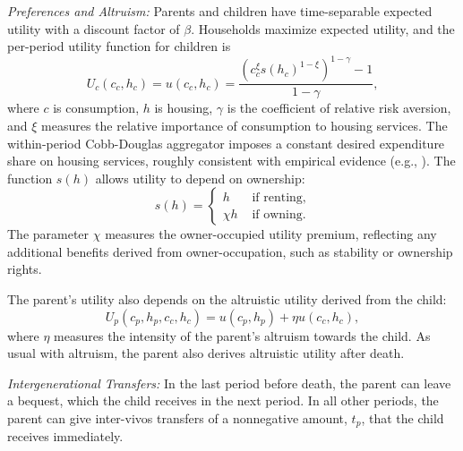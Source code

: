\documentclass[12pt]{article}
\begin{document}
\textit{Preferences and Altruism:} Parents and children have time-separable expected utility with a discount factor of $\beta$. Households maximize expected utility, and the per-period utility function for children is
\begin{equation}
U_c(c_c,h_c) = u(c_c,h_c) = \frac{\left(c_c^\xi s(h_c)^{1-\xi}\right)^{1-\gamma}-1}{1-\gamma},
\end{equation}
where $c$ is consumption, $h$ is housing, $\gamma$ is the coefficient of relative risk aversion, and $\xi$ measures the relative importance of consumption to housing services. The within-period Cobb-Douglas aggregator imposes a constant desired expenditure share on housing services, roughly consistent with empirical evidence (e.g., \cite{davis2011household}). The function $s(h)$ allows utility to depend on ownership:
\begin{equation}
s(h) = \begin{cases}
h & \text{ if renting}, \\
\chi h & \text{ if owning}.
\end{cases}
\end{equation}
The parameter $\chi$ measures the owner-occupied utility premium, reflecting any additional benefits derived from owner-occupation, such as stability or ownership rights.

The parent's utility also depends on the altruistic utility derived from the child:
\begin{equation}
U_p(c_p,h_p,c_c,h_c) = u(c_p,h_p) + \eta u(c_c,h_c),
\end{equation}
where $\eta$ measures the intensity of the parent's altruism towards the child. As usual with altruism, the parent also derives altruistic utility after death.

\textit{Intergenerational Transfers:} In the last period before death, the parent can leave a bequest, which the child receives in the next period. In all other periods, the parent can give inter-vivos transfers of a nonnegative amount, $t_p$, that the child receives immediately.
\end{document}
